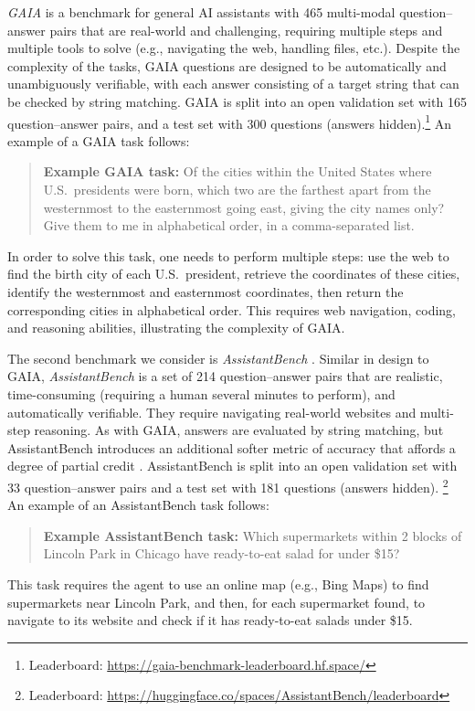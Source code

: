 \emph{GAIA} \cite{mialon2023gaiabenchmarkgeneralai} is a benchmark for general AI assistants with 465 multi-modal question--answer pairs that are real-world and challenging, requiring multiple steps and multiple tools to solve (e.g., navigating the web, handling files, etc.). Despite the complexity of the tasks, GAIA questions are designed to be automatically and unambiguously verifiable, with each answer consisting of a target string that can be checked by string matching. GAIA is split into an open validation set with 165 question--answer pairs, and a test set with 300 questions (answers hidden).\footnote{Leaderboard: \url{https://gaia-benchmark-leaderboard.hf.space/}}
An example of a GAIA task follows:
\begin{quote}
\textbf{Example GAIA task:} Of the cities within the United States where U.S.\ presidents were born, which two are the farthest apart from the westernmost to the easternmost going east, giving the city names only? Give them to me in alphabetical order, in a comma-separated list.
\end{quote}
In order to solve this task, one needs to perform multiple steps: use the web to find the birth city of each U.S.\ president, retrieve the coordinates of these cities, identify the westernmost and easternmost coordinates, then return the corresponding cities in alphabetical order. This requires web navigation, coding, and reasoning abilities, illustrating the complexity of GAIA. 

The second benchmark we consider is \emph{AssistantBench} \cite{yoran2024assistantbenchwebagentssolve}. Similar in design to GAIA, \emph{AssistantBench} is a set of 214 question--answer pairs that are realistic, time-consuming (requiring a human several minutes to perform), and automatically verifiable. They require navigating real-world websites and multi-step reasoning. As with GAIA, answers are evaluated by string matching, but AssistantBench introduces an additional softer metric of accuracy that affords a degree of partial credit \cite{yoran2024assistantbenchwebagentssolve}. AssistantBench is split into an open validation set with 33 question--answer pairs and a test set with 181 questions (answers hidden).%
\footnote{Leaderboard: \url{https://huggingface.co/spaces/AssistantBench/leaderboard}}
An example of an AssistantBench task follows:
\begin{quote}
\textbf{Example AssistantBench task:} Which supermarkets within 2 blocks of Lincoln Park in Chicago have ready-to-eat salad for under \$15?
\end{quote}
This task requires the agent to use an online map (e.g., Bing Maps) to find supermarkets near Lincoln Park, and then, for each supermarket found, to navigate to its website and check if it has ready-to-eat salads under \$15. 

